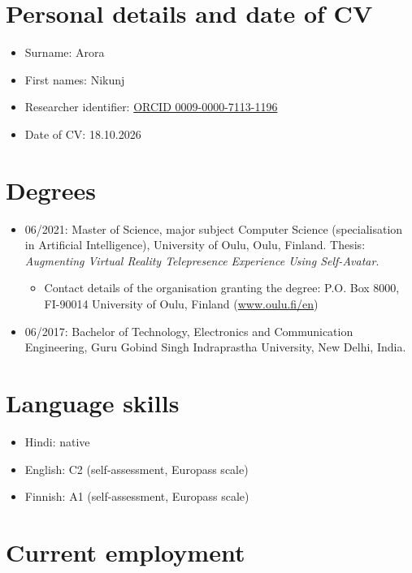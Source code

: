 \documentclass[a4paper,12pt]{article}
\begin{document}
\section*{Personal details and date of CV}

\begin{itemize}
    \item Surname: Arora
    \item First names: Nikunj
    \item Researcher identifier: \href{https://orcid.org/0009-0000-7113-1196}{ORCID 0009-0000-7113-1196}
    \item Date of CV: 18.10.2026
\end{itemize}

\section*{Degrees}

\begin{itemize}
    \item 06/2021: Master of Science, major subject Computer Science (specialisation in Artificial Intelligence), University of Oulu, Oulu, Finland. Thesis: \emph{Augmenting Virtual Reality Telepresence Experience Using Self-Avatar}.
    \begin{itemize}
        \item Contact details of the organisation granting the degree: P.O. Box 8000, FI-90014 University of Oulu, Finland (\href{https://www.oulu.fi/en}{www.oulu.fi/en})
    \end{itemize}
    \item 06/2017: Bachelor of Technology, Electronics and Communication Engineering, Guru Gobind Singh Indraprastha University, New Delhi, India.
\end{itemize}

\section*{Language skills}

\begin{itemize}
    \item Hindi: native
    \item English: C2 (self-assessment, Europass scale)
    \item Finnish: A1 (self-assessment, Europass scale)
\end{itemize}

\section*{Current employment}
\end{document}
